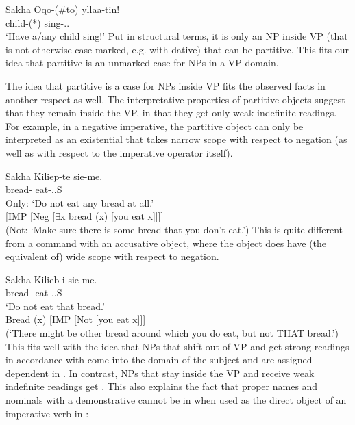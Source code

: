 \documentclass[output=paper]{langsci/langscibook}
\begin{document}
\ea\label{ex:key:12.5}Sakha
    \sn
	\gll    Oqo-(\#to)  yllaa-tin!\\
		    child-(*\Part{})  sing-\Imp{}.\Tsg.\Sbj{}\\
	\glt    ‘Have a/any child sing!’
\z
Put in structural terms, it is only an NP inside VP (that is not otherwise case
marked, e.g. with dative) that can be partitive. This fits our idea that
partitive is an unmarked case for NPs in a VP domain.

The idea that partitive is a case for NPs inside VP fits the observed facts in
another respect as well. The interpretative properties of partitive objects
suggest that they remain inside the VP, in that they get only weak indefinite
readings.  For example, in a negative imperative, the partitive object can only
be interpreted as an existential that takes narrow scope with respect to
negation (as well as with respect to the imperative operator itself).

\ea\label{ex:key:12.6}Sakha
    \sn
	\gll Kiliep-te  sie-me.\\
		bread-\Part{} eat-\Imp{}.\Neg{}.\Ssg{}S\\
	\glt Only: ‘Do not eat any bread at all.’\\
		 {}[IMP [Neg [${\exists}$x bread (x) [you eat x]]]]\\
		(Not: ‘Make sure there is some bread that you don’t eat.’)
\z
This is quite different from a command with an accusative object, where the
object does have (the equivalent of) wide scope with respect to negation.

\ea\label{ex:key:12.7}Sakha
    \sn
	\gll Kilieb-i  sie-me.\\
		bread-\Acc{}  eat-\Imp{}.\Neg{}.\Ssg{}S\\
	\glt ‘Do not eat that bread.’\\
		Bread (x) [IMP [Not [you eat x]]]\\
		(‘There might be other bread around which you do eat, but not THAT bread.’)
\z
This fits well with the idea that NPs that shift out of VP and get strong
readings in accordance with   come into
the domain of the subject and are assigned dependent  in .
In contrast, NPs that stay inside the VP and receive weak indefinite readings
get .  This also explains the fact that proper names and nominals
with a demonstrative cannot be in  when used as the direct object
of an imperative verb in :
\end{document}
